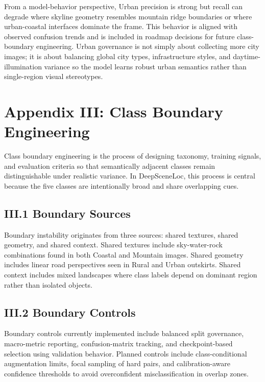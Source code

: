 From a model-behavior perspective, Urban precision is strong but recall can degrade where skyline geometry resembles mountain ridge boundaries or where urban-coastal interfaces dominate the frame. This behavior is aligned with observed confusion trends and is included in roadmap decisions for future class-boundary engineering. Urban governance is not simply about collecting more city images; it is about balancing global city types, infrastructure styles, and daytime-illumination variance so the model learns robust urban semantics rather than single-region visual stereotypes.

\section*{Appendix III: Class Boundary Engineering}

Class boundary engineering is the process of designing taxonomy, training signals, and evaluation criteria so that semantically adjacent classes remain distinguishable under realistic variance. In DeepSceneLoc, this process is central because the five classes are intentionally broad and share overlapping cues.

\subsection*{III.1 Boundary Sources}
Boundary instability originates from three sources: shared textures, shared geometry, and shared context. Shared textures include sky-water-rock combinations found in both Coastal and Mountain images. Shared geometry includes linear road perspectives seen in Rural and Urban outskirts. Shared context includes mixed landscapes where class labels depend on dominant region rather than isolated objects.

\subsection*{III.2 Boundary Controls}
Boundary controls currently implemented include balanced split governance, macro-metric reporting, confusion-matrix tracking, and checkpoint-based selection using validation behavior. Planned controls include class-conditional augmentation limits, focal sampling of hard pairs, and calibration-aware confidence thresholds to avoid overconfident misclassification in overlap zones.

